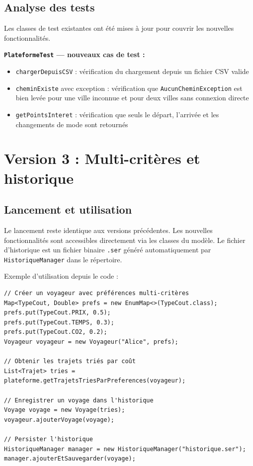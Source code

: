 \documentclass[fontsize=10pt,oneside,parskip=half]{scrreprt}
\newcommand{\ic}[1]{{\setlength{\fboxsep}{2pt}\colorbox{BeigeSerein}{\texttt{#1}}}}
\begin{document}
\section{Analyse des tests}

Les classes de test existantes ont été mises à jour pour couvrir les nouvelles
fonctionnalités.

\noindent\textbf{\ic{PlateformeTest} — nouveaux cas de test :}
\begin{itemize}
  \item \ic{chargerDepuisCSV} : vérification du chargement depuis un fichier CSV valide
  \item \ic{cheminExiste} avec exception : vérification que \ic{AucunCheminException}
        est bien levée pour une ville inconnue et pour deux villes sans connexion directe
  \item \ic{getPointsInteret} : vérification que seuls le départ, l'arrivée et les
        changements de mode sont retournés
\end{itemize}

\chapter{Version 3 : Multi-critères et historique}

\section{Lancement et utilisation}

Le lancement reste identique aux versions précédentes. Les nouvelles fonctionnalités
sont accessibles directement via les classes du modèle. Le fichier d'historique est un
fichier binaire \ic{.ser} généré automatiquement par \ic{HistoriqueManager} dans le
répertoire.

Exemple d'utilisation depuis le code :

\begin{lstlisting}[style=java]
// Créer un voyageur avec préférences multi-critères
Map<TypeCout, Double> prefs = new EnumMap<>(TypeCout.class);
prefs.put(TypeCout.PRIX, 0.5);
prefs.put(TypeCout.TEMPS, 0.3);
prefs.put(TypeCout.CO2, 0.2);
Voyageur voyageur = new Voyageur("Alice", prefs);

// Obtenir les trajets triés par coût
List<Trajet> tries = plateforme.getTrajetsTriesParPreferences(voyageur);

// Enregistrer un voyage dans l'historique
Voyage voyage = new Voyage(tries);
voyageur.ajouterVoyage(voyage);

// Persister l'historique
HistoriqueManager manager = new HistoriqueManager("historique.ser");
manager.ajouterEtSauvegarder(voyage);
\end{lstlisting}
\end{document}
